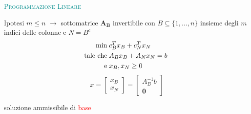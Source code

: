 
\begin{frame}{\textsc{\LARGE \textcolor{darkcyan}{Programmazione Lineare}}}

Ipotesi $m \leq n$ \pause$\longrightarrow$ sottomatrice $\mathbf{A_{B}}$ invertibile con
$B\subseteq\{1,\dots,n\}$ insieme degli $m$ indici delle colonne e $N = B^{c}$
\pause
\begin{equation*}
\begin{split}
\min\;&c_{B}^{T}x_{B}+c_{N}^{T}x_{N}\\
\text{tale che\;}&A_{B}x_{B}+A_{N}x_{N}= b\;\\\text{e\;}&x_{B},x_{N}\geq0
\end{split}
\end{equation*}
\pause
\begin{equation*}
x = \left[\begin{matrix}x_{B}\\x_{N}\end{matrix}\right] = \left[\begin{matrix}A_{B}^{-1}b\\\mathbf{0}\end{matrix}\right]
\end{equation*}
\begin{center}
	soluzione ammissibile di \textcolor{red}{base}
\end{center}
\end{frame}


